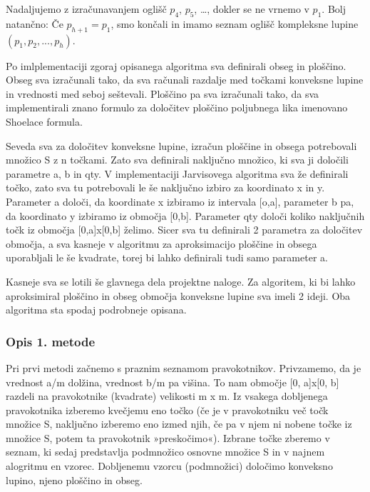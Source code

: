 \documentclass[
]{article}
\begin{document}
Nadaljujemo z izračunavanjem oglišč \(p_4\), \(p_5\), \ldots, dokler se
ne vrnemo v \(p_1\). Bolj natančno: Če \(p_{h+1} = p_1\), smo končali in
imamo seznam oglišč kompleksne lupine \((p_1, p_2, ... , p_h)\).

\newline Po imlplementaciji zgoraj opisanega algoritma sva definirali
obseg in ploščino. Obseg sva izračunali tako, da sva računali razdalje
med točkami konveksne lupine in vrednosti med seboj seštevali. Ploščino
pa sva izračunali tako, da sva implementirali znano formulo za določitev
ploščino poljubnega lika imenovano Shoelace formula.

Seveda sva za določitev konveksne lupine, izračun ploščine in obsega
potrebovali množico S z n točkami. Zato sva definirali naključno
množico, ki sva ji določili parametre a, b in qty. V implementaciji
Jarvisovega algoritma sva že definirali točko, zato sva tu potrebovali
le še naključno izbiro za koordinato x in y. Parameter a določi, da
koordinate x izbiramo iz intervala {[}o,a{]}, parameter b pa, da
koordinato y izbiramo iz območja {[}0,b{]}. Parameter qty določi koliko
naključnih točk iz območja {[}0,a{]}x{[}0,b{]} želimo. Sicer sva tu
definirali 2 parametra za določitev območja, a sva kasneje v algoritmu
za aproksimacijo ploščine in obsega uporabljali le še kvadrate, torej bi
lahko definirali tudi samo parameter a.

Kasneje sva se lotili še glavnega dela projektne naloge. Za algoritem,
ki bi lahko aproksimiral ploščino in obseg območja konveksne lupine sva
imeli 2 ideji. Oba algoritma sta spodaj podrobneje opisana.

\hypertarget{opis-1.-metode}{%
\subsubsection{Opis 1. metode}\label{opis-1.-metode}}

Pri prvi metodi začnemo s praznim seznamom pravokotnikov. Privzamemo, da
je vrednost a/m dolžina, vrednost b/m pa višina. To nam območje {[}0,
a{]}x{[}0, b{]} razdeli na pravokotnike (kvadrate) velikosti m x m. Iz
vsakega dobljenega pravokotnika izberemo kvečjemu eno točko (če je v
pravokotniku več točk množice S, naključno izberemo eno izmed njih, če
pa v njem ni nobene točke iz množice S, potem ta pravokotnik
»preskočimo«). Izbrane točke zberemo v seznam, ki sedaj predstavlja
podmnožico osnovne množice S in v najnem alogritmu en vzorec. Dobljenemu
vzorcu (podmnožici) določimo konveksno lupino, njeno ploščino in obseg.
\end{document}
